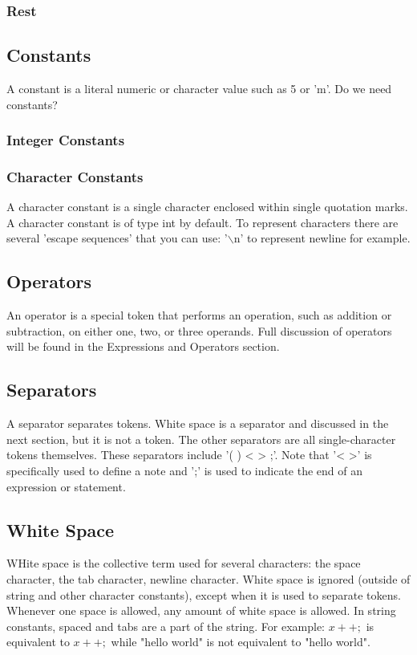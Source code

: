 \documentclass[letterpaper]{article}
\begin{document}
\subsubsection{Rest}
\subsection{Constants}
A constant is a literal numeric or character value such as 5 or 'm'.
Do we need constants?
\subsubsection{Integer Constants}
\subsubsection{Character Constants}
A character constant is a single character enclosed within single quotation marks. A character constant is of type int by default. To represent characters there are several 'escape sequences' that you can use: '$\backslash$n' to represent newline for example. 
\subsection{Operators}
An operator is a special token that performs an operation, such as addition or subtraction, on either one, two, or three operands. Full discussion of operators will be found in the Expressions and Operators section.
\subsection{Separators}
A separator separates tokens. White space is a separator and discussed in the next section, but it is not a token. The other separators are all single-character tokens themselves. These separators include '( ) < > ;'. Note that '< >' is specifically used to define a note and ';' is used to indicate the end of an expression or statement. 
\subsection{White Space}
WHite space is the collective term used for several characters: the space character, the tab character, newline character. White space is ignored (outside of string and other character constants),  except when it is used to separate tokens. Whenever one space is allowed, any amount of white space is allowed. In string constants, spaced and tabs are a part of the string.
For example: $x++;$ is equivalent to $x     ++;$ while "hello world" is not equivalent to "hello         world".
\end{document}
